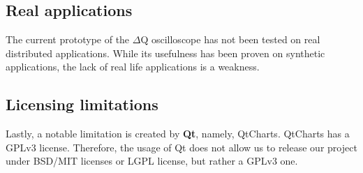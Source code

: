     \subsection{Real applications}
       The current prototype of the $\Delta$Q oscilloscope has not been tested on real distributed applications. While its usefulness has been proven on synthetic applications, the lack of real life applications is a weakness.

    \subsection{Licensing limitations}
    Lastly, a notable limitation is created by \textbf{Qt}, namely, QtCharts. QtCharts has a GPLv3 license. Therefore, the usage of Qt does not allow us to release our project under BSD/MIT licenses or LGPL license, but rather a GPLv3 one. \cite{qt-gpl}
